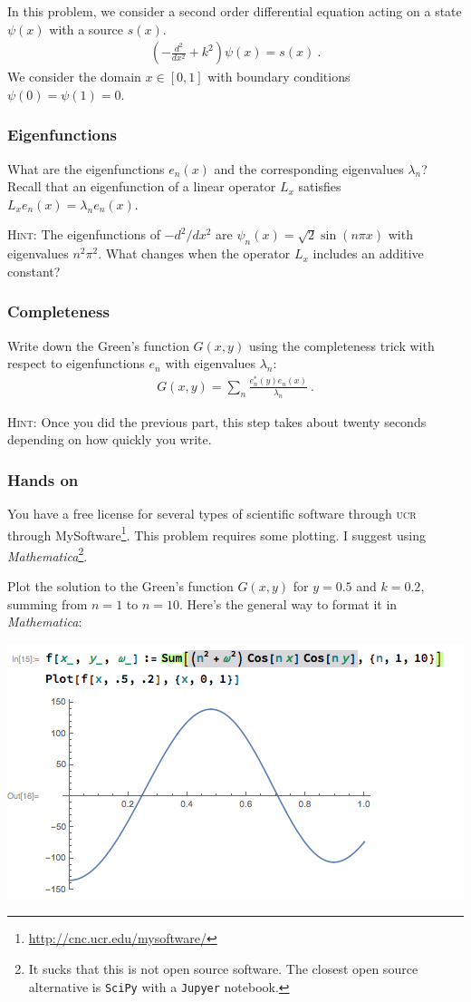 \documentclass[12pt]{article}
\newcommand{\acro}[1]{\textsc{\MakeLowercase{#1}}}
\numberwithin{equation}{subsection}    %
\begin{document}
In this problem, we consider a second order differential equation acting on a state $\psi(x)$ with a source $s(x)$. 
\begin{align*}
	\left(-\frac{d^2}{dx^2} + k^2 \right) \psi(x) = s(x) \ .
\end{align*}
We consider the domain $x\in[0,1]$ with boundary conditions $\psi(0) = \psi(1) = 0$.

\subsubsection{Eigenfunctions}

What are the eigenfunctions $e_n(x)$ and the corresponding eigenvalues $\lambda_n$? Recall that an eigenfunction of a linear operator $L_x$ satisfies $L_x e_n(x) = \lambda_n e_n(x)$. 


\textsc{Hint:} The eigenfunctions of $-d^2/dx^2$ are $\psi_n(x) = \sqrt{2} \sin (n\pi x)$ with eigenvalues $n^2 \pi^2$. What changes when the operator $L_x$ includes an additive constant?


\subsubsection{Completeness}


Write down the Green's function $G(x,y)$ using the completeness trick with respect to eigenfunctions $e_n$ with eigenvalues $\lambda_n$: 
\begin{align}
	G(x,y) = \sum_n \frac{e_n^*(y)e_n(x)}{\lambda_n} \ .
\end{align}

\textsc{Hint:} Once you did the previous part, this step takes about twenty seconds depending on how quickly you write.


\subsubsection{Hands on}

You have a free license for several types of scientific software 
through \acro{UCR} through MySoftware\footnote{\url{http://cnc.ucr.edu/mysoftware/}}. This problem requires some plotting. I suggest using \emph{Mathematica}\footnote{It sucks that this is not open source software. The closest open source alternative is \texttt{SciPy} with a \texttt{Jupyer} notebook.}. 

Plot the solution to the Green's function $G(x,y)$ for $y = 0.5$ and $k = 0.2$, summing from $n=1$ to $n=10$. Here's the general way to format it in \emph{Mathematica}:
\begin{center}
	\includegraphics[width=.6\textwidth]{P231_2017_HW4_fig1.png}
\end{center}
\end{document}
